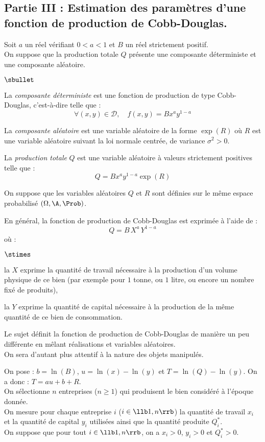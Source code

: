 \documentclass[11pt]{article}%
\begin{document}
\subsection*{Partie III : Estimation des paramètres d'une fonction de 
production de Cobb-Douglas.}
\noindent 
Soit $a$ un réel vérifiant $0 < a < 1$ et $B$ un réel 
strictement positif.\\
On suppose que la production totale $Q$ présente une composante 
déterministe et une composante aléatoire.
\begin{noliste}{$\sbullet$}
 \item La {\it composante déterministe} est une fonction de 
 production de type Cobb-Douglas, c'est-à-dire telle que :
 \[
  \forall (x,y) \in \mathcal{D},\quad f(x,y)=Bx^ay^{1-a}
 \]
 
 \item La {\it composante aléatoire} est une variable aléatoire de la 
 forme $\exp(R)$ où $R$ est une variable aléatoire suivant la loi 
 normale centrée, de variance $\sigma^2>0$.
 
 \item La {\it production totale} $Q$ est une variable aléatoire à 
 valeurs strictement positives telle que :
 \[
  Q=Bx^ay^{1-a} \exp(R)
 \]
\end{noliste}
On suppose que les variables aléatoires $Q$ et $R$ sont définies sur 
le même espace probabilisé $(\Omega,\A,\Prob)$.

\begin{remark}
 En général, la fonction de production de Cobb-Douglas est 
 exprimée à l'aide de \var :
 \[
  Q = B \, X^a \, Y^{1-a}
 \]
 où :
 \begin{noliste}{$\stimes$}
  \item la \var $X$ exprime la quantité de travail nécessaire à la
   production d'un volume physique de ce bien (par exemple pour $1$
   tonne, ou $1$ litre, ou encore un nombre fixé de produits),
  \item la \var $Y$ exprime la quantité de capital nécessaire à la
   production de la même quantité de ce bien de consommation.
 \end{noliste}
 Le sujet définit la fonction de production de Cobb-Douglas de
 manière un peu différente en mêlant réalisations et variables 
 aléatoires.\\
 On sera d'autant plus attentif à la nature des objets manipulés.
\end{remark}

\noindent
On pose : $b=\ln(B)$, $u=\ln(x) - \ln(y)$ et $T=\ln(Q)-\ln(y)$. On a 
donc : $T=au+b+R$.\\
On sélectionne $n$ entreprises ($n \geq 1$) qui produisent le bien 
considéré à l'époque donnée.\\
On mesure pour chaque entreprise $i$ ($i \in \llb 1,n \rrb$) la 
quantité de travail $x_i$ et la quantité de capital $y_i$ utilisées
ainsi que la quantité produite $Q_i^*$.\\
On suppose que pour tout $i \in \llb 1,n \rrb$, on a $x_i>0$, $y_i>0$ 
et $Q_i^*>0$.
\end{document}
